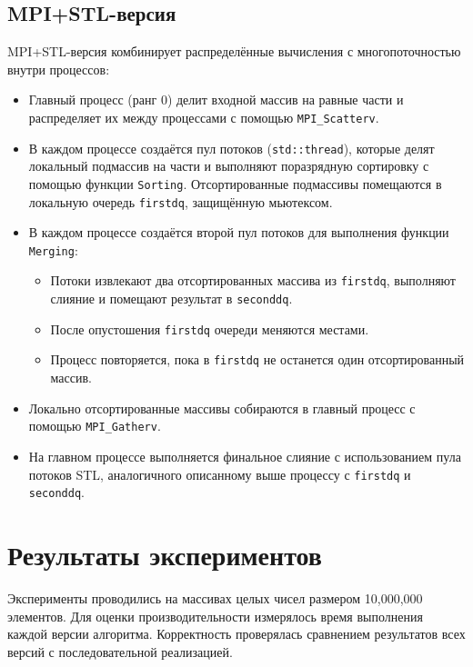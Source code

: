 \documentclass[a4paper,12pt]{article}
\begin{document}
\subsection{MPI+STL-версия}
MPI+STL-версия комбинирует распределённые вычисления с многопоточностью внутри процессов:
\begin{itemize}
    \item Главный процесс (ранг 0) делит входной массив на равные части и распределяет их между процессами с помощью \texttt{MPI\_Scatterv}.
    \item В каждом процессе создаётся пул потоков (\texttt{std::thread}), которые делят локальный подмассив на части и выполняют поразрядную сортировку с помощью функции \texttt{Sorting}. Отсортированные подмассивы помещаются в локальную очередь \texttt{firstdq}, защищённую мьютексом.
    \item В каждом процессе создаётся второй пул потоков для выполнения функции \texttt{Merging}:
        \begin{itemize}
            \item Потоки извлекают два отсортированных массива из \texttt{firstdq}, выполняют слияние и помещают результат в \texttt{seconddq}.
            \item После опустошения \texttt{firstdq} очереди меняются местами.
            \item Процесс повторяется, пока в \texttt{firstdq} не останется один отсортированный массив.
        \end{itemize}
    \item Локально отсортированные массивы собираются в главный процесс с помощью \texttt{MPI\_Gatherv}.
    \item На главном процессе выполняется финальное слияние с использованием пула потоков STL, аналогичного описанному выше процессу с \texttt{firstdq} и \texttt{seconddq}.
\end{itemize}

\section{Результаты экспериментов}
Эксперименты проводились на массивах целых чисел размером 10,000,000 элементов. Для оценки производительности измерялось время выполнения каждой версии алгоритма. Корректность проверялась сравнением результатов всех версий с последовательной реализацией.
\end{document}

